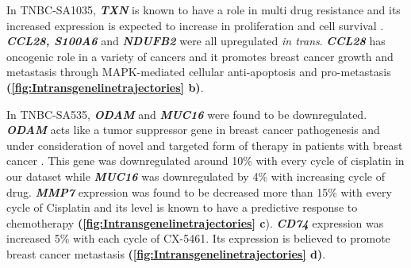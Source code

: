 In TNBC-SA1035, \textit{\textbf{TXN}} is known to have a role in multi drug resistance and its increased expression is expected to increase in proliferation and cell survival \cite{mieszala2018expression, powis2000role}.
\textit{\textbf{CCL28, S100A6}} and \textit{\textbf{NDUFB2}} were all upregulated \textit{in trans}. \textit{\textbf{CCL28}} has oncogenic role in a variety of cancers and it promotes breast cancer growth and metastasis through MAPK-mediated cellular anti-apoptosis and pro-metastasis \cite{yang2017ccl28, lin2013ccl28} \textbf{(\autoref{fig:Intransgenelinetrajectories} b)}. 

In TNBC-SA535, \textit{\textbf{ODAM}} and \textit{\textbf{MUC16}} were found to be downregulated. \textit{\textbf{ODAM}} acts like a tumor suppressor gene in breast cancer pathogenesis and under consideration of novel and targeted form of therapy in patients with breast cancer  \cite{kestler2011odam, foster2013odontogenic}. This gene was downregulated around 10\% with every cycle of cisplatin in our dataset while \textit{\textbf{MUC16}} was downregulated by 4\% with increasing cycle of drug. \textit{\textbf{MMP7}} expression was found to be decreased more than 15\% with every cycle of Cisplatin and its level is known to have a predictive response to chemotherapy \cite{liu2008predictive} \textbf{(\autoref{fig:Intransgenelinetrajectories} c}).  \textit{\textbf{CD74}} expression was increased 5\% with each cycle of CX-5461. Its expression is believed to promote breast cancer metastasis \cite{otterstrom2014cd74, gai2018expression, wang2017cd74} \textbf{(\autoref{fig:Intransgenelinetrajectories} d)}.


